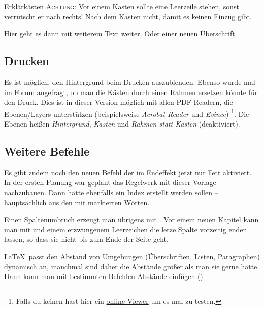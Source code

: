 \begin{multicols}{2}[        %
		]
\begin{kasten}{4.8cm}{Erklärkästen}
	\textsc{Achtung:} Vor einem Kasten sollte eine Leerzeile stehen, sonst verrutscht er nach rechts! Nach dem Kasten nicht, damit es keinen Einzug gibt.
\end{kasten}

Hier geht es dann mit weiterem Text weiter. Oder einer neuen Überschrift.

\subsection{Drucken}
Es ist möglich, den Hintergrund beim Drucken auszublenden.
Ebenso wurde mal im Forum angefragt, ob man die Kästen durch einen Rahmen ersetzen könnte für den Druck.
Dies ist in dieser Version möglich mit allen PDF-Readern, die Ebenen/Layers unterstützen (beispielsweise \emph{Acrobat Reader} und \emph{Evince})
\footnote{Falls du keinen hast hier ein \href{https://www.pdftron.com/webviewer/demo}{online Viewer} um es mal zu testen.}.
Die Ebenen heißen \emph{Hintergrund}, \emph{Kasten} und \emph{Rahmen-statt-Kasten} (deaktiviert).


\clearpage %

 
\subsection{Weitere Befehle}

Es gibt zudem noch den neuen Befehl  der im Endeffekt jetzt nur Fett aktiviert. In der ersten Planung war geplant das Regelwerk mit dieser Vorlage nachzubauen. Dann hätte ebenfalls ein Index erstellt werden sollen – hauptsächlich aus den mit  markierten Wörten.

Einen Spaltenumbruch erzeugt man übrigens mit . Vor einem neuen Kapitel kann man mit  und einem erzwungenem Leerzeichen die letze Spalte vorzeitig enden lassen, so dass sie nicht bis zum Ende der Seite geht. 

\LaTeX\ passt den Abstand von Umgebungen (Überschriften, Listen, Paragraphen) dynamisch an, manchmal sind daher die Abstände größer als man sie gerne hätte. Dann kann man mit bestimmten Befehlen Abstände einfügen ()


\end{multicols}
